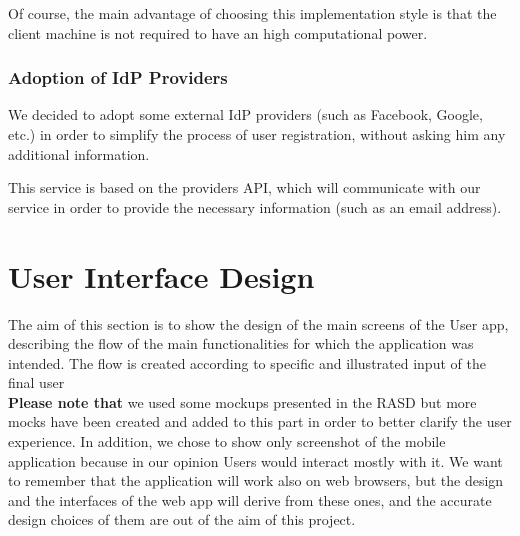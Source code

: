 \documentclass[table, 12pt]{article}
\begin{document}
Of course, the main advantage of choosing this implementation style is that the client machine is not required to have an high computational power.

\subsubsection{Adoption of IdP Providers}
We decided to adopt some external IdP providers (such as Facebook, Google, etc.) in order to simplify the process of user registration, without asking him any additional information.

This service is based on the providers API, which will communicate with our service in order to provide the necessary information (such as an email address).

\section{User Interface Design}
The aim of this section is to show the design of the main screens of the User app, describing the flow of the main functionalities for which the application was intended. The flow is created according to specific and illustrated input of the final user \\
\textbf{Please note that} we used some mockups presented in the RASD but more mocks have been created and added to this part in order to better clarify the user experience. In addition, we chose to show only screenshot of the mobile application because in our opinion Users would interact mostly with it. We want to remember that the application will work also on web browsers, but the design and the interfaces of the web app will derive from these ones, and the accurate design choices of them are out of the aim of this project. \\
\end{document}
